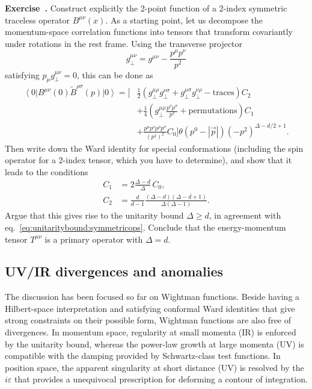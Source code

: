 \documentclass[a4paper,12pt]{article}
\newcommand{\ket}[1]{\left| #1 \right\rangle}
\newcommand{\bra}[1]{\left\langle #1 \right|}
\numberwithin{equation}{section}
\newcounter{exercise}[section]
\newenvironment{exercise}[1][]%
	{\refstepcounter{exercise}\bigskip
	\begin{mdframed}[backgroundcolor=gray!20, linewidth=0]
	\noindent\textbf{Exercise~\thesection.\theexercise #1} \rmfamily}
  	{\end{mdframed}\bigskip}
\begin{document}
\begin{exercise}
	Construct explicitly the 2-point function of a 2-index
	symmetric traceless operator $B^{\mu\nu}(x)$.
	As a starting point, let us decompose the momentum-space
	correlation functions into tensors that transform covariantly
	under rotations in the rest frame. Using the transverse projector 
	$$ g_\perp^{\mu\nu} = g^{\mu\nu} - \frac{p^\mu p^\nu}{p^2}$$
	satisfying $p_\mu g_\perp^{\mu\nu} = 0$, this can be done as
	\begin{align*}
		\bra{0} B^{\mu\nu}(0) \widetilde{B}^{\rho\sigma}(p) \ket{0}
		= \bigg[ & \frac{1}{2}
		\left( g_\perp^{\mu\rho} g_\perp^{\nu\sigma}
		+ g_\perp^{\mu\sigma} g_\perp^{\nu\rho} - \text{traces} \right)
		C_2
		\\
		& + \frac{1}{4}
		\left( g_\perp^{\mu\rho} \frac{p^\nu p^\sigma}{p^2}
		+ \text{permutations} \right) C_1
		\\
		& + \frac{p^\mu p^\nu p^\rho p^\sigma}{(p^2)^2}
		C_0 \bigg]
		\theta\left( p^0 - \left| \vec{p} \right| \right)
		(-p^2)^{\Delta - d/2 + 1}.
	\end{align*}
	Then write down the Ward identity for special conformations
	(including the spin operator for a 2-index tensor, which 
	you have to determine),
	and show that it leads to the conditions
	\begin{align*}
		C_1 &= 2 \frac{\Delta - d}{\Delta} \, C_0,
		\\
		C_2 &= \frac{d}{d-1} \frac{(\Delta - d) (\Delta - d + 1)}
		{\Delta (\Delta - 1)}.
	\end{align*}
	Argue that this gives rise to the unitarity bound $ \Delta \geq d$,
	in agreement with eq.~\eqref{eq:unitaritybound:symmetricops}.
	Conclude that the energy-momentum tensor $T^{\mu\nu}$
	is a primary operator with $\Delta = d$.
\end{exercise}


\subsection{UV/IR divergences and anomalies}

The discussion has been focused so far on Wightman functions. Beside having a Hilbert-space interpretation and satisfying conformal Ward identities that give strong constraints on their possible form, Wightman functions are also free of divergences.
In momentum space, regularity at small momenta (IR) is enforced by the unitarity bound, whereas the power-law growth at large momenta (UV) is compatible with the damping provided by Schwartz-class test functions.
In position space, the apparent singularity at short distance (UV) is resolved by the $i \varepsilon$ that provides a unequivocal prescription for deforming a contour of integration.
\end{document}
